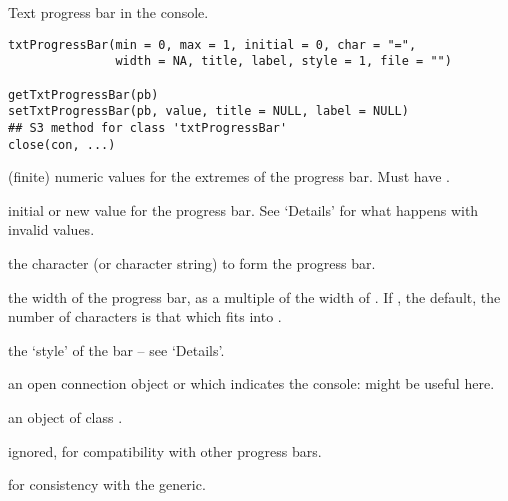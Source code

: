 %
\begin{Description}\relax
Text progress bar in the \R{} console.
\end{Description}
%
\begin{Usage}
\begin{verbatim}
txtProgressBar(min = 0, max = 1, initial = 0, char = "=",
               width = NA, title, label, style = 1, file = "")

getTxtProgressBar(pb)
setTxtProgressBar(pb, value, title = NULL, label = NULL)
## S3 method for class 'txtProgressBar'
close(con, ...)
\end{verbatim}
\end{Usage}
%
\begin{Arguments}
\begin{ldescription}
\item[\code{min, max}] (finite) numeric values for the extremes of the
progress bar. Must have .
\item[\code{initial, value}] initial or new value for the progress bar.  See
`Details' for what happens with invalid values.
\item[\code{char}] the character (or character string) to form the progress bar.
\item[\code{width}] the width of the progress bar, as a multiple of the width
of .  If , the default, the number of characters
is that which fits into .
\item[\code{style}] the `style' of the bar -- see `Details'.
\item[\code{file}] an open connection object or  which indicates
the console:  might be useful here.
\item[\code{pb, con}] an object of class .
\item[\code{title, label}] ignored, for compatibility with other progress bars.
\item[\code{...}] for consistency with the generic.
\end{ldescription}
\end{Arguments}
%
